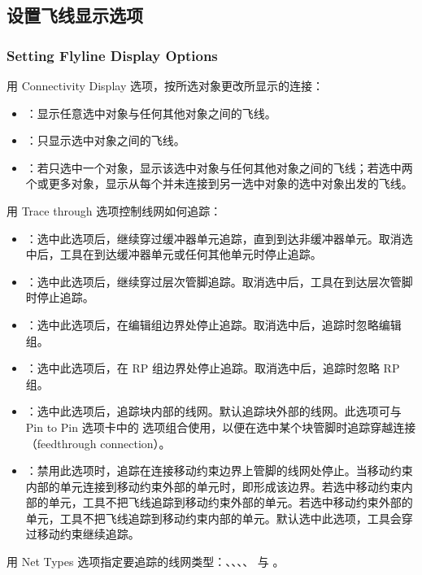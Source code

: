 \subsection{设置飞线显示选项}
\subsubsection*{Setting Flyline Display Options}

用 Connectivity Display 选项，按所选对象更改所显示的连接：
\begin{itemize}
  \item {}：显示任意选中对象与任何其他对象之间的飞线。
  \item {}：只显示选中对象之间的飞线。
  \item {}：若只选中一个对象，显示该选中对象与任何其他对象之间的飞线；若选中两个或更多对象，显示从每个并未连接到另一选中对象的选中对象出发的飞线。
\end{itemize}

用 Trace through 选项控制线网如何追踪：
\begin{itemize}
  \item {}：选中此选项后，继续穿过缓冲器单元追踪，直到到达非缓冲器单元。取消选中后，工具在到达缓冲器单元或任何其他单元时停止追踪。
  \item {}：选中此选项后，继续穿过层次管脚追踪。取消选中后，工具在到达层次管脚时停止追踪。
  \item {}：选中此选项后，在编辑组边界处停止追踪。取消选中后，追踪时忽略编辑组。
  \item {}：选中此选项后，在 RP 组边界处停止追踪。取消选中后，追踪时忽略 RP 组。
  \item {}：选中此选项后，追踪块内部的线网。默认追踪块外部的线网。此选项可与 Pin to Pin 选项卡中的  选项组合使用，以便在选中某个块管脚时追踪穿越连接（feedthrough connection）。
  \item {}：禁用此选项时，追踪在连接移动约束边界上管脚的线网处停止。当移动约束内部的单元连接到移动约束外部的单元时，即形成该边界。若选中移动约束内部的单元，工具不把飞线追踪到移动约束外部的单元。若选中移动约束外部的单元，工具不把飞线追踪到移动约束内部的单元。默认选中此选项，工具会穿过移动约束继续追踪。
\end{itemize}

用 Net Types 选项指定要追踪的线网类型：、、、、 与 。

